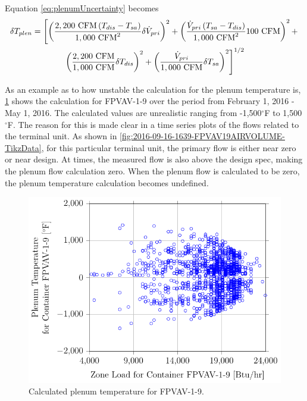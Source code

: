 Equation \ref{eq:plenumUncertainty} becomes
\begin{multline}\label{eq:plenumUncertainty}
    \delta T_{plen} = \left[\left(  \frac{ 2,200\text{ CFM}   \left(T_{dis}-T_{sa} \right)}{{1,000\text{ CFM}}^2}   \delta \dot{V}_{pri} \right)^2  +\left(\frac{\dot{V}_{pri}\left(T_{sa}-T_{dis} \right)}{{1,000\text{ CFM}}^2} 100\text{ CFM} \right)^2 + \right. \\
    \left. \left( \frac{2,200\text{ CFM}}{1,000\text{ CFM}} \delta T_{dis}   \right)^2 + \left(\frac{\dot{V}_{pri}}{1,000\text{ CFM}}  \delta T_{sa}   \right)^2  \right]^{1/2}
\end{multline}

As an example as to how unstable the calculation for the plenum temperature is, \figref{} \ref{fig:2016-09-16-1006-PlenumTemperatureforContainerFPVAV19vsZoneLoadforContainerFPVAV19} shows the calculation for FPVAV-1-9 over the period from February 1, 2016 - May 1, 2016. The calculated values are unrealistic ranging from -1,500\(^\circ\)F to 1,500\(^\circ\)F. The reason for this is made clear in a time series plots of the flows related to the terminal unit. As shown in \figref{} \ref{fig:2016-09-16-1639-FPVAV19AIRVOLUME-TikzData}, for this particular terminal unit, the primary flow is either near zero or near design. At times, the measured flow is also above the design spec, making the plenum flow calculation zero. When the plenum flow is calculated to be zero, the plenum temperature calculation becomes undefined.




\begin{figure}
\centering
\includegraphics[]{Plots/2016-09-16-1006-PlenumTemperatureforContainerFPVAV19vsZoneLoadforContainerFPVAV19.pdf}
\caption{Calculated plenum temperature for FPVAV-1-9.}
\label{fig:2016-09-16-1006-PlenumTemperatureforContainerFPVAV19vsZoneLoadforContainerFPVAV19}
\end{figure}

